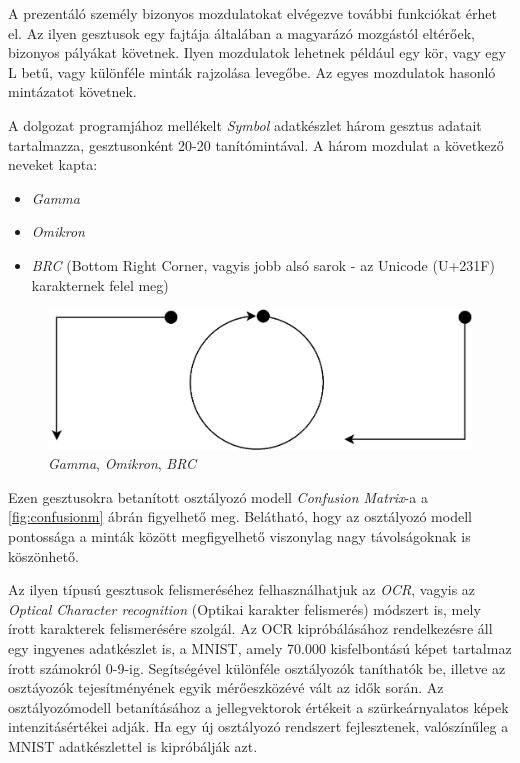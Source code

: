 
A prezentáló személy bizonyos mozdulatokat elvégezve további funkciókat érhet el. Az ilyen gesztusok egy fajtája általában a magyarázó mozgástól eltérőek, bizonyos pályákat követnek. Ilyen mozdulatok lehetnek például egy kör, vagy egy L betű, vagy különféle minták rajzolása levegőbe. Az egyes mozdulatok hasonló mintázatot követnek.

A dolgozat programjához mellékelt \textit{Symbol} adatkészlet három gesztus adatait tartalmazza, gesztusonként 20-20 tanítómintával. A három mozdulat a következő neveket kapta:
\begin{itemize}
	\item \textit{Gamma}
	\item \textit{Omikron}
	\item \textit{BRC} (Bottom Right Corner, vagyis jobb alsó sarok - az Unicode (U+231F) karakternek felel meg)
\end{itemize}
\begin{figure}[h]
\centering
\includegraphics[width=10truecm]{images/symbols.png}
\caption{\textit{Gamma}, \textit{Omikron}, \textit{BRC}}
\label{fig:symbols}
\end{figure}

Ezen gesztusokra betanított osztályozó modell \textit{Confusion Matrix}-a a \ref{fig:confusionm} ábrán figyelhető meg. Belátható, hogy az osztályozó modell pontossága a minták között megfigyelhető viszonylag nagy távolságoknak is köszönhető.

Az ilyen típusú gesztusok felismeréséhez felhasználhatjuk az \textit{OCR}, vagyis az \textit{Optical Character recognition} (Optikai karakter felismerés) módszert is, mely írott karakterek felismerésére szolgál. 
Az OCR kipróbálásához rendelkezésre áll egy ingyenes adatkészlet is, a MNIST, amely 70.000 kisfelbontású képet tartalmaz írott számokról 0-9-ig. Segítségével különféle osztályozók taníthatók be, illetve az osztáyozók tejesítményének egyik mérőeszközévé vált az idők során. Az osztályozómodell betanításához a jellegvektorok értékeit a szürkeárnyalatos képek intenzitásértékei adják. Ha egy új osztályozó rendszert fejlesztenek, valószínűleg a MNIST adatkészlettel is kipróbálják azt. \cite{geron2019hands}

